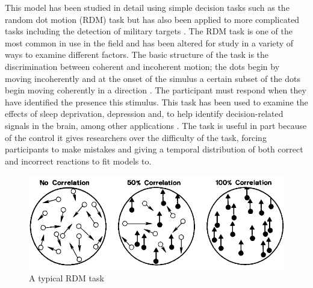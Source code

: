 This model has been studied in detail using simple decision tasks such as the random dot motion (RDM) task but has also been applied to more complicated tasks including the detection of military targets \cite{heitzNeuralMechanismsSpeedAccuracy2012}. The RDM task is one of the most common in use in the field and has been altered for study in a variety of ways to examine different factors. The basic structure of the task is the discrimination between coherent and incoherent motion; the dots begin by moving incoherently and at the onset of the simulus a certain subset of the dots begin moving coherently in a direction \cite{brittenAnalysisVisualMotion1992}. The participant must respond when they have identified the presence this stimulus. This task has been used to examine the effects of sleep deprivation, depression and, to help identify decision-related signals in the brain, among other applications \cite{ratcliffDiffusionModelOnechoice2011, kellyInternalExternalInfluences2013, whiteUsingDiffusionModels2010}. The task is useful in part because of the control it gives researchers over the difficulty of the task, forcing participants to make mistakes and giving a temporal distribution of both correct and incorrect reactions to fit models to.
\begin{figure}
    \centering
    \includegraphics[width=0.75\linewidth]{figures/dots.PNG}
    \caption{A typical RDM task \cite{brittenAnalysisVisualMotion1992}}
    \label{fig:RDM}
\end{figure}


